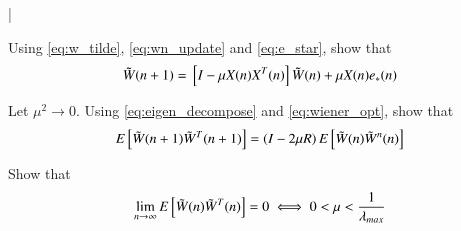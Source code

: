 |\documentclass[journal,12pt,twocolumn]{IEEEtran}
\begin{document}
\begin{problem}
Using \eqref{eq:w_tilde}, \eqref{eq:wn_update} and \eqref{eq:e_star},  show that 
\begin{equation}
\tilde W(n+1) = {}\left[I - \mu X(n) X^{T}(n) \right]\tilde W(n) + \mu X(n)e_{*}(n)
\end{equation}
\begin{problem}
Let $\mu^2 \to 0$.  Using \eqref{eq:eigen_decompose} and \eqref{eq:wiener_opt}, show that
\begin{equation}
E{}\left[\tilde W(n+1)\tilde W^{T}(n+1)\right] = \left(I - 2\mu R\right)E{}\left[\tilde W(n)\tilde W^{n}(n)\right]
\end{equation}
\end{problem}
\end{problem}
%
\begin{problem}
Show that 
\begin{equation}
\lim_{n\to\infty}E{}\left[\tilde W(n)\tilde W^{T}(n)\right] = 0 \iff 0 < \mu < \dfrac{1}{\lambda_{max}}
\end{equation}
\end{problem}
\end{document}
